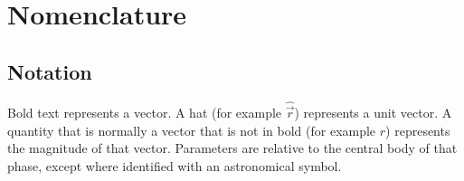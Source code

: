 \chapter*{Nomenclature}

\section*{Notation}

Bold text represents a vector. A hat (for example $\hat{\vec{r}}$) represents a unit vector. A quantity that is normally a vector that is not in bold (for example $r$) represents the magnitude of that vector. Parameters are relative to the central body of that phase, except where identified with an astronomical symbol.

\begin{longtable}{l p{}}


\end{longtable}
